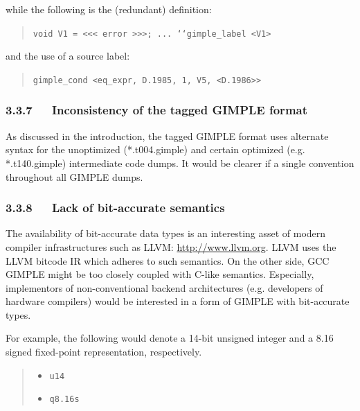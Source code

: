 \documentclass[a4paper]{article}
\begin{document}
while the following is the (redundant) definition:
%
\begin{quote}

\texttt{void V1 = <{}<{}< error >{}>{}>;
...
`{}`gimple\_label <V1>}

\end{quote}

and the use of a source label:
%
\begin{quote}

\texttt{gimple\_cond <eq\_expr, D.1985, 1, V5, <D.1986>{}>}

\end{quote}


\subsubsection{3.3.7~~~Inconsistency of the tagged GIMPLE format%
  \label{inconsistency-of-the-tagged-gimple-format}%
}

As discussed in the introduction, the tagged GIMPLE format uses alternate
syntax for the unoptimized (*.t004.gimple) and certain optimized (e.g.
*.t140.gimple) intermediate code dumps. It would be clearer if a single
convention throughout all GIMPLE dumps.


\subsubsection{3.3.8~~~Lack of bit-accurate semantics%
  \label{lack-of-bit-accurate-semantics}%
}

The availability of bit-accurate data types is an interesting asset of
modern compiler infrastructures such as LLVM: \url{http://www.llvm.org}. LLVM
uses the LLVM bitcode IR which adheres to such semantics. On the other
side, GCC GIMPLE might be too closely coupled with C-like semantics.
Especially, implementors of non-conventional backend architectures
(e.g. developers of hardware compilers) would be interested in a form of
GIMPLE with bit-accurate types.

For example, the following would denote a 14-bit unsigned integer
and a 8.16 signed fixed-point representation, respectively.
%
\begin{quote}
%
\begin{itemize}

\item \texttt{u14}

\item \texttt{q8.16s}

\end{itemize}

\end{quote}
\end{document}
